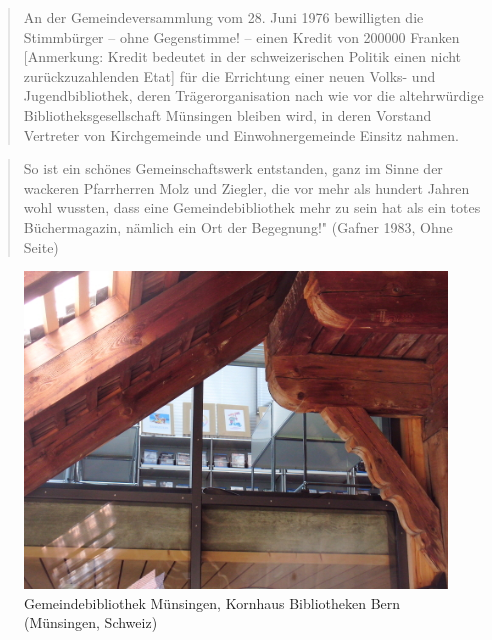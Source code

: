 \documentclass[a4paper,
fontsize=11pt,
oneside,
numbers=noperiodatend,
parskip=half-,
bibliography=totoc,
final
]{scrartcl}
\begin{document}
\begin{quote}
An der Gemeindeversammlung vom 28. Juni 1976 bewilligten die Stimmbürger
-- ohne Gegenstimme! -- einen Kredit von 200000 Franken {[}Anmerkung:
Kredit bedeutet in der schweizerischen Politik einen nicht
zurückzuzahlenden Etat{]} für die Errichtung einer neuen Volks- und
Jugendbibliothek, deren Trägerorganisation nach wie vor die
altehrwürdige Bibliotheksgesellschaft Münsingen bleiben wird, in deren
Vorstand Vertreter von Kirchgemeinde und Einwohnergemeinde Einsitz
nahmen.
\end{quote}

\begin{quote}
So ist ein schönes Gemeinschaftswerk entstanden, ganz im Sinne der
wackeren Pfarrherren Molz und Ziegler, die vor mehr als hundert Jahren
wohl wussten, dass eine Gemeindebibliothek mehr zu sein hat als ein
totes Büchermagazin, nämlich ein Ort der Begegnung!" (Gafner 1983, Ohne
Seite)
\end{quote}

\begin{figure}[H]
\centering
\includegraphics{./img/063.jpg}
\caption{Gemeindebibliothek Münsingen, Kornhaus Bibliotheken Bern
(Münsingen,
Schweiz)}
\end{figure}
\end{document}
